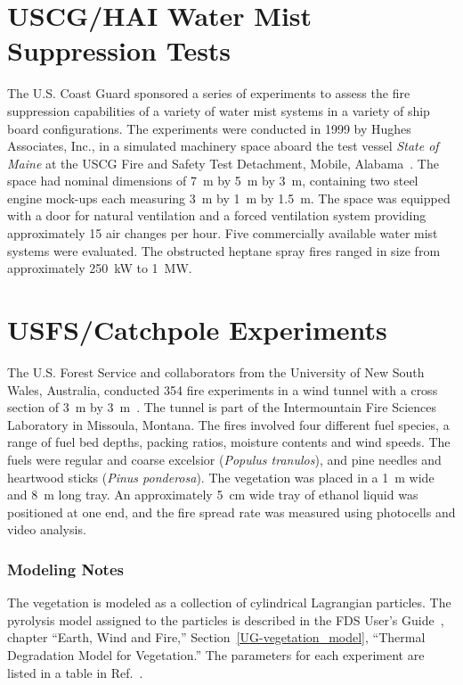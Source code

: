 \section{USCG/HAI Water Mist Suppression Tests}
\label{USCG_HAI_Water_Mist_Description}

The U.S. Coast Guard sponsored a series of experiments to assess the fire suppression capabilities of a variety of water mist systems in a variety of ship board configurations. The experiments were conducted in 1999 by Hughes Associates, Inc., in a simulated machinery space aboard the test vessel {\em State of Maine} at the USCG Fire and Safety Test Detachment, Mobile, Alabama~\cite{Back:USCG1999}. The space had nominal dimensions of 7~m by 5~m by 3~m, containing two steel engine mock-ups each measuring 3~m by 1~m by 1.5~m. The space was equipped with a door for natural ventilation and a forced ventilation system providing approximately 15 air changes per hour. Five commercially available water mist systems were evaluated. The obstructed heptane spray fires ranged in size from approximately 250~kW to 1~MW.


\section{USFS/Catchpole Experiments}
\label{USFS_Catchpole_Description}

The U.S. Forest Service and collaborators from the University of New South Wales, Australia, conducted 354 fire experiments in a wind tunnel with a cross section of 3~m by 3~m~\cite{Catchpole:CST1998}. The tunnel is part of the Intermountain Fire Sciences Laboratory in Missoula, Montana. The fires involved four different fuel species, a range of fuel bed depths, packing ratios, moisture contents and wind speeds. The fuels were regular and coarse excelsior ({\em Populus tranulos}), and pine needles and heartwood sticks ({\em Pinus ponderosa}). The vegetation was placed in a 1~m wide and 8~m long tray. An approximately 5~cm wide tray of ethanol liquid was positioned at one end, and the fire spread rate was measured using photocells and video analysis.

\subsubsection{Modeling Notes}

The vegetation is modeled as a collection of cylindrical Lagrangian particles. The pyrolysis model assigned to the particles is described in the FDS User's Guide~\cite{FDS_Users_Guide}, chapter ``Earth, Wind and Fire,'' Section~\ref{UG-vegetation_model}, ``Thermal Degradation Model for Vegetation.'' The parameters for each experiment are listed in a table in Ref.~\cite{Catchpole:CST1998}.


